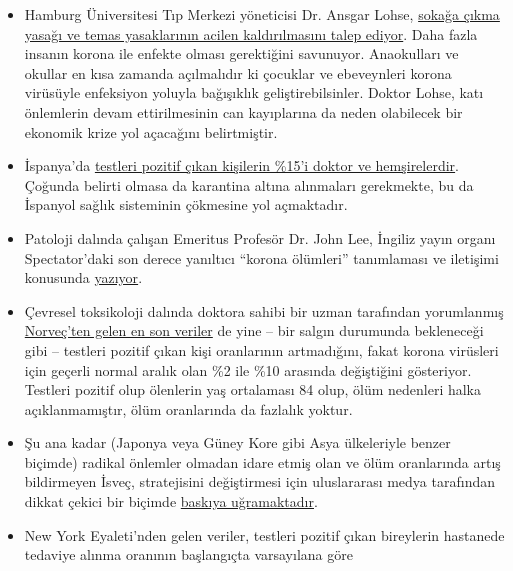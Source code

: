 \begin{itemize}
\tightlist
\item
  Hamburg Üniversitesi Tıp Merkezi yöneticisi Dr. Ansgar Lohse,
  \href{https://www.mopo.de/hamburg/uke-infektiologe-fordert-es-muessen-sich-mehr-menschen-mit-corona-infizieren-36483636}{sokağa
  çıkma yasağı ve temas yasaklarının acilen kaldırılmasını talep
  ediyor}. Daha fazla insanın korona ile enfekte olması gerektiğini
  savunuyor. Anaokulları ve okullar en kısa zamanda açılmalıdır ki
  çocuklar ve ebeveynleri korona virüsüyle enfeksiyon yoluyla bağışıklık
  geliştirebilsinler. Doktor Lohse, katı önlemlerin devam ettirilmesinin
  can kayıplarına da neden olabilecek bir ekonomik krize yol açacağını
  belirtmiştir.
\item
  İspanya'da
  \href{https://www.heise.de/tp/features/Das-ist-keine-Krise-sondern-eine-Katastrophe-4694104.html}{testleri
  pozitif çıkan kişilerin \%15'i doktor ve hemşirelerdir}. Çoğunda
  belirti olmasa da karantina altına alınmaları gerekmekte, bu da
  İspanyol sağlık sisteminin çökmesine yol açmaktadır. 
\item
  Patoloji dalında çalışan Emeritus Profesör Dr. John Lee, İngiliz yayın
  organı Spectator'daki son derece yanıltıcı ``korona ölümleri''
  tanımlaması ve iletişimi konusunda
  \href{https://www.spectator.co.uk/article/how-to-understand-and-report-figures-for-covid-19-deaths-}{yazıyor}.
\item
  Çevresel toksikoloji dalında doktora sahibi bir uzman tarafından
  yorumlanmış
  \href{https://swprs.files.wordpress.com/2020/04/die-lage-in-norwegen.pdf}{Norveç'ten
  gelen en son veriler} de yine -- bir salgın durumunda bekleneceği gibi
  -- testleri pozitif çıkan kişi oranlarının artmadığını, fakat korona
  virüsleri için geçerli normal aralık olan \%2 ile \%10 arasında
  değiştiğini gösteriyor. Testleri pozitif olup ölenlerin yaş ortalaması
  84 olup, ölüm nedenleri halka açıklanmamıştır, ölüm oranlarında da
  fazlalık yoktur. 
\item
  Şu ana kadar (Japonya veya Güney Kore gibi Asya ülkeleriyle benzer
  biçimde) radikal önlemler olmadan idare etmiş olan ve ölüm oranlarında
  artış bildirmeyen İsveç, stratejisini değiştirmesi için uluslararası
  medya tarafından dikkat çekici bir biçimde
  \href{https://www.theguardian.com/world/2020/mar/30/catastrophe-sweden-coronavirus-stoicism-lockdown-europe}{baskıya
  uğramaktadır}. 
\item
  New York Eyaleti'nden gelen veriler, testleri pozitif çıkan bireylerin
  hastanede tedaviye alınma oranının başlangıçta varsayılana göre

\end{itemize}
